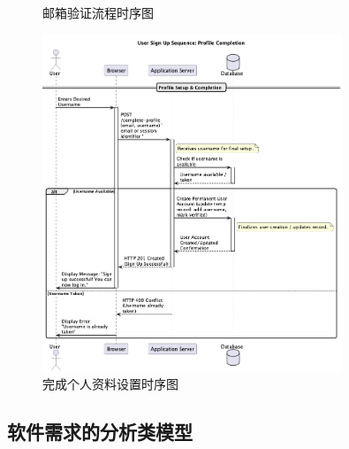 \documentclass[
    report,     %
    oneside,    %
    UTF8,       %
    zihao=-4    %
]{config} %
\begin{document}
\begin{enumerate}[label=(\arabic*)]
\begin{figure}[H]
        \caption{邮箱验证流程时序图}
        \label{fig:UserSignupSequenceDiagram2}
    \end{figure}
    \begin{figure}[H]
        \centering
        \includegraphics[width=0.8\textwidth]{UML/Squence/signup_part3.png}
        \caption{完成个人资料设置时序图}
        \label{fig:UserSignupSequenceDiagram3}
    \end{figure}
\end{enumerate}

\subsection{软件需求的分析类模型}
\end{document}
